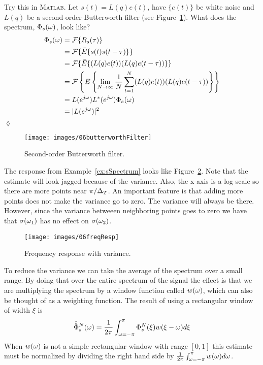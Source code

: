 \begin{example}
\label{ex:sSpectrum}
Try this in \textsc{Matlab}.
Let $s(t)=L(q)e(t)$, have $\{e(t)\}$ be white noise and $L(q)$ be a second-order Butterworth filter (see Figure~\ref{fig:06butterworthFilter}).
What does the spectrum, $\Phi_s(\omega)$, look like?
\begin{align*}
\Phi_s(\omega) &= \mathcal{F}\{R_s(\tau)\} \\
&= \mathcal{F}\{\bar{E}\{s(t)s(t-\tau)\}\} \\
&= \mathcal{F}\{\bar{E}\{(L(q)e(t))(L(q)e(t-\tau))\}\} \\
&= \mathcal{F}\left\lbrace E\left\lbrace\lim_{N\to\infty}\frac{1}{N}\sum_{t=1}^N(L(q)e(t))(L(q)e(t-\tau))\right\rbrace\right\rbrace \\
&= L(e^{j\omega})L^*(e^{j\omega})\Phi_e(\omega) \\
&= |L(e^{j\omega})|^2
\end{align*}
$\lozenge$
\end{example}

\begin{figure}[ht!]
\centering
\texttt{[image: images/06butterworthFilter]}
\caption{Second-order Butterworth filter.}
\label{fig:06butterworthFilter}
\end{figure}

The response from Example~\ref{ex:sSpectrum} looks like Figure~\ref{fig:06freqResp}.
Note that the estimate will look jagged because of the variance.
Also, the x-axis is a log scale so there are more points near $\pi/\Delta_T$.
An important feature is that adding more points does not make the variance go to zero.
The variance will always be there.
However, since the variance betweeen neighboring points goes to zero we have that $\sigma(\omega_1)$ has no effect on $\sigma(\omega_2)$.

\begin{figure}[ht!]
\centering
\texttt{[image: images/06freqResp]}
\caption{Frequency response with variance.}
\label{fig:06freqResp}
\end{figure}

To reduce the variance we can take the average of the spectrum over a small range.
By doing that over the entire spectrum of the signal the effect is that we are multiplying the spectrum by a window function called $w(\omega)$, which can also be thought of as a weighting function.
The result of using a rectangular window of width $\xi$ is
$$\hat{\hat{\Phi}}_s^N(\omega) = \frac{1}{2\pi}\int_{\omega=-\pi}^\pi \Phi_s^N(\xi)w(\xi-\omega)d\xi$$
When $w(\omega)$ is not a simple rectangular window with range $[0,1]$ this estimate must be normalized by dividing the right hand side by $\frac{1}{2\pi}\int_{\omega=-\pi}^\pi w(\omega)d\omega$.

